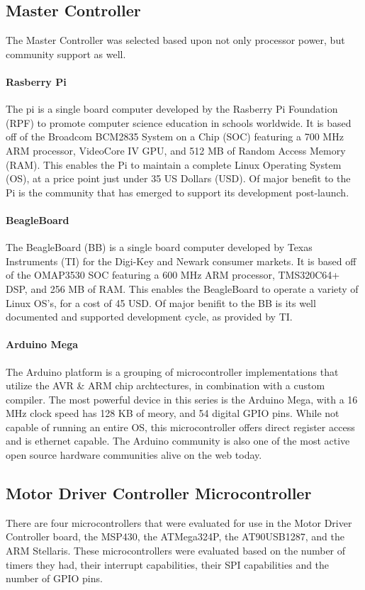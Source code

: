 \subsection{Master Controller}
The Master Controller  was selected based upon not only processor power, but community support as well. 

\paragraph{Rasberry Pi}
The \gls{pi} is a single board computer developed by the Rasberry Pi Foundation (RPF) to promote computer science education in schools worldwide.
It is based off of the Broadcom BCM2835 System on a Chip (SOC) featuring a 700 MHz ARM processor, VideoCore IV GPU, and 512 MB of Random Access Memory (RAM).
This enables the Pi to maintain a complete Linux Operating System (OS), at a price point just under 35 US Dollars (USD).
Of major benefit to the Pi is the community that has emerged to support its development post-launch.

\paragraph{BeagleBoard}
The BeagleBoard (BB) is a single board computer developed by Texas Instruments (TI) for the Digi-Key and Newark consumer markets.
It is based off of the OMAP3530 SOC featuring a 600 MHz ARM processor, TMS320C64+ DSP, and 256 MB of RAM.
This enables the BeagleBoard to operate a variety of Linux OS’s, for a cost of 45 USD.
Of major beniﬁt to the BB is its well documented and supported development cycle, as provided by TI.

\paragraph{Arduino Mega}
The Arduino platform is a grouping of microcontroller implementations that utilize the AVR \& ARM chip archtectures, in combination with a custom compiler.
The most powerful device in this series is the Arduino Mega, with a 16 MHz clock speed has 128 KB of meory, and 54 digital GPIO pins.
While not capable of running an entire OS, this microcontroller offers direct register access and is ethernet capable.
The Arduino community is also one of the most active open source hardware communities alive on the web today.

\subsection{Motor Driver Controller Microcontroller}
There are four microcontrollers that were evaluated for use in the Motor Driver Controller board, the MSP430, the ATMega324P, the AT90USB1287, and the ARM Stellaris.
These microcontrollers were evaluated based on the number of timers they had, their interrupt capabilities, their SPI capabilities and the number of GPIO pins.

